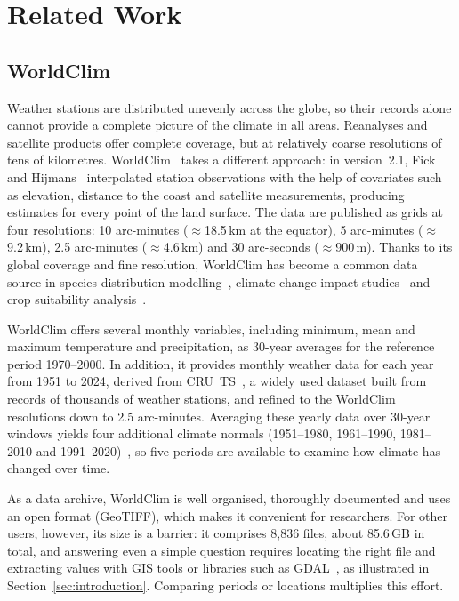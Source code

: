 \section{Related Work}\label{sec:related} %

\subsection{WorldClim}\label{sec:related:worldclim}
Weather stations are distributed unevenly across the globe, so their records alone
cannot provide a complete picture of the climate in all areas. Reanalyses and satellite
products offer complete coverage, but at relatively coarse resolutions of tens of
kilometres. WorldClim~\cite{worldclim} takes a different approach: in version~2.1, Fick
and Hijmans~\cite{fick2017worldclim} interpolated station observations with the help of
covariates such as elevation, distance to the coast and satellite measurements, producing
estimates for every point of the land surface. The data are published as grids at four
resolutions: 10 arc-minutes ($\approx$18.5\,km at the equator), 5 arc-minutes
($\approx$9.2\,km), 2.5 arc-minutes ($\approx$4.6\,km) and 30 arc-seconds
($\approx$900\,m). Thanks to its global coverage and fine resolution, WorldClim has become
a common data source in species distribution modelling~\cite{jimenez2021climate}, climate
change impact studies~\cite{berio2023examining} and crop suitability
analysis~\cite{xian2022predicting}.

WorldClim offers several monthly variables, including minimum, mean and maximum
temperature and precipitation, as 30-year averages for the reference period 1970--2000.
In addition, it provides monthly weather data for each year from 1951 to 2024, derived
from CRU~TS~\cite{harris2020version}, a widely used dataset built from records of thousands
of weather stations, and refined to the WorldClim resolutions down to 2.5 arc-minutes.
Averaging these yearly data over 30-year windows yields four additional climate normals
(1951--1980, 1961--1990, 1981--2010 and 1991--2020)~\cite{scrapi}, so five periods are
available to examine how climate has changed over time.

As a data archive, WorldClim is well organised, thoroughly documented and uses an
open format (GeoTIFF), which makes it convenient for researchers. For other users,
however, its size is a barrier: it comprises 8{,}836 files, about 85.6\,GB in total, and
answering even a simple question requires locating the right file and extracting values
with GIS tools or libraries such as GDAL~\cite{mcinerney2015open}, as illustrated in
Section~\ref{sec:introduction}. Comparing periods or locations multiplies this effort.

